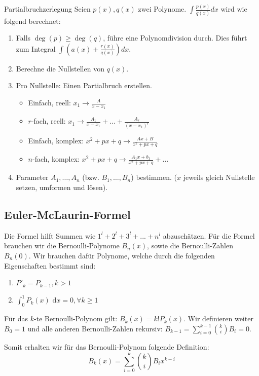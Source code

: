 \documentclass[a4paper,10pt]{article}
\def\dx{\text{ d}x}
\begin{document}
\begin{mainbox}{Partialbruchzerlegung}
 Seien $p(x), q(x)$ zwei Polynome. $\int \frac{p(x)}{q(x)} dx$ wird wie folgend berechnet:
 \begin{enumerate}
  \item Falls $\deg(p) \ge \deg(q)$, führe eine Polynomdivision durch. Dies führt zum Integral $\int (a(x) + \frac{r(x)}{q(x)})dx$.
  \item Berechne die Nullstellen von $q(x)$.
  \item Pro Nullstelle: Einen Partialbruch erstellen.
  \begin{itemize}[left=0pt]
   \item Einfach, reell: $x_1 \to \frac{A}{x - x_1}$
   \item $r$-fach, reell: $x_1 \to \frac{A_1}{x - x_1} + \ldots + \frac{A_r}{(x-x_1)^r}$ 
   \item Einfach, komplex: $x^2 + px + q \to \frac{Ax + B} {x^2 + px + q}$
   \item $n$-fach, komplex: $x^2 + px + q \to \frac{A_1x+b_1}{x^2+px+q} + \ldots$
  \end{itemize}
  \item Parameter $A_1, \ldots, A_n$ (bzw. $B_1, \ldots, B_n$) bestimmen. ($x$ jeweils gleich Nullstelle setzen, umformen und lösen).

 \end{enumerate}
\end{mainbox}

\subsection{Euler-McLaurin-Formel}
Die Formel hilft Summen wie $1^l + 2^l + 3^l + ... + n^l$ abzuschätzen.
Für die Formel brauchen wir die Bernoulli-Polynome $B_n(x)$, sowie die Bernoulli-Zahlen $B_n(0)$.
Wir brauchen dafür Polynome, welche durch die folgenden Eigenschaften bestimmt sind:

\begin{enumerate}
  \item $P'_k = P_{k-1}, k > 1$
  \item $\int_0^1 P_k(x)\dx = 0, \forall k \geq 1$
\end{enumerate}

Für das $k$-te Bernoulli-Polynom gilt: $B_k(x) = k!P_k(x)$. Wir definieren weiter $B_0=1$ und alle anderen Bernoulli-Zahlen rekursiv: $B_{k-1} = \sum_{i=0}^{k-1}{k \choose i}B_i = 0$.

Somit erhalten wir für das Bernoulli-Polynom folgende Definition: $$B_k(x) = \sum_{i=0}^{k}{k \choose i}B_ix^{k-i}$$
\end{document}
